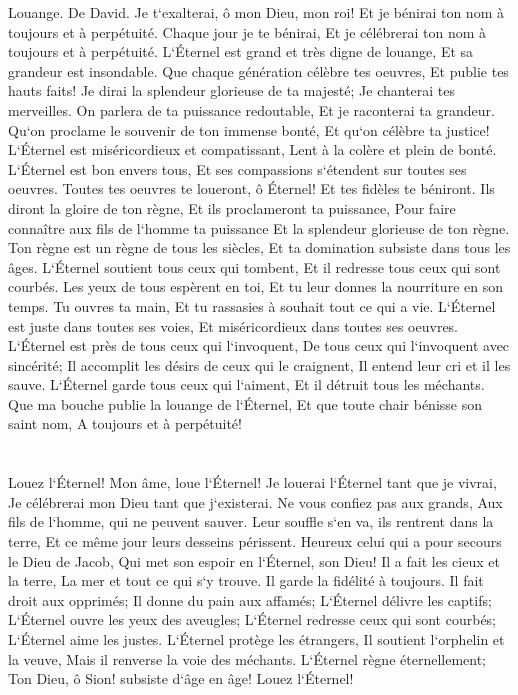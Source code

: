 \verse Louange. De David. Je t`exalterai, ô mon Dieu, mon roi! Et je bénirai ton nom à toujours et à perpétuité. 
\verse Chaque jour je te bénirai, Et je célébrerai ton nom à toujours et à perpétuité. 
\verse L`Éternel est grand et très digne de louange, Et sa grandeur est insondable. 
\verse Que chaque génération célèbre tes oeuvres, Et publie tes hauts faits! 
\verse Je dirai la splendeur glorieuse de ta majesté; Je chanterai tes merveilles. 
\verse On parlera de ta puissance redoutable, Et je raconterai ta grandeur. 
\verse Qu`on proclame le souvenir de ton immense bonté, Et qu`on célèbre ta justice! 
\verse L`Éternel est miséricordieux et compatissant, Lent à la colère et plein de bonté. 
\verse L`Éternel est bon envers tous, Et ses compassions s`étendent sur toutes ses oeuvres. 
\verse Toutes tes oeuvres te loueront, ô Éternel! Et tes fidèles te béniront. 
\verse Ils diront la gloire de ton règne, Et ils proclameront ta puissance, 
\verse Pour faire connaître aux fils de l`homme ta puissance Et la splendeur glorieuse de ton règne. 
\verse Ton règne est un règne de tous les siècles, Et ta domination subsiste dans tous les âges. 
\verse L`Éternel soutient tous ceux qui tombent, Et il redresse tous ceux qui sont courbés. 
\verse Les yeux de tous espèrent en toi, Et tu leur donnes la nourriture en son temps. 
\verse Tu ouvres ta main, Et tu rassasies à souhait tout ce qui a vie. 
\verse L`Éternel est juste dans toutes ses voies, Et miséricordieux dans toutes ses oeuvres. 
\verse L`Éternel est près de tous ceux qui l`invoquent, De tous ceux qui l`invoquent avec sincérité; 
\verse Il accomplit les désirs de ceux qui le craignent, Il entend leur cri et il les sauve. 
\verse L`Éternel garde tous ceux qui l`aiment, Et il détruit tous les méchants. 
\verse Que ma bouche publie la louange de l`Éternel, Et que toute chair bénisse son saint nom, A toujours et à perpétuité! 

\chapter{}

\verse Louez l`Éternel! Mon âme, loue l`Éternel! 
\verse Je louerai l`Éternel tant que je vivrai, Je célébrerai mon Dieu tant que j`existerai. 
\verse Ne vous confiez pas aux grands, Aux fils de l`homme, qui ne peuvent sauver. 
\verse Leur souffle s`en va, ils rentrent dans la terre, Et ce même jour leurs desseins périssent. 
\verse Heureux celui qui a pour secours le Dieu de Jacob, Qui met son espoir en l`Éternel, son Dieu! 
\verse Il a fait les cieux et la terre, La mer et tout ce qui s`y trouve. Il garde la fidélité à toujours. 
\verse Il fait droit aux opprimés; Il donne du pain aux affamés; L`Éternel délivre les captifs; 
\verse L`Éternel ouvre les yeux des aveugles; L`Éternel redresse ceux qui sont courbés; L`Éternel aime les justes. 
\verse L`Éternel protège les étrangers, Il soutient l`orphelin et la veuve, Mais il renverse la voie des méchants. 
\verse L`Éternel règne éternellement; Ton Dieu, ô Sion! subsiste d`âge en âge! Louez l`Éternel! 

